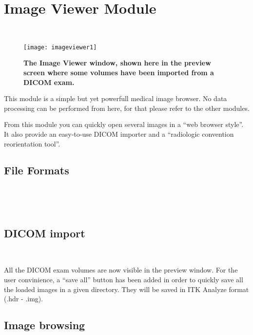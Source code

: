 \index{}\chapter{Image Viewer Module}
\label{sec:imageviewer}

\minitoc \ \\

\begin{figure}[htbp]
  \centering \texttt{[image: imageviewer1]}
  \caption{{\bf The Image Viewer window, shown here in the preview screen where some
      volumes have been imported from a DICOM exam.}
  \label{fig:imageviewer}}
\end{figure}

This module is a simple but yet powerfull medical image browser. No data processing can be
performed from here, for that please refer to the other modules.

From this module you can quickly open several images in a ``web browser style''. It also provide an easy-to-use DICOM
importer and a ``radiologic convention reorientation tool''. 

\section{File Formats}
\label{sec:fileformats}
\ \\

\ifalone

\else
	
\fi

\ \\

\section{DICOM import}
\label{sec:dicomimport}
\ \\

\ifalone

\else
	
\fi



All the DICOM exam volumes are now visible in the preview window. For the user
convinience, a ``save all'' button has been added in order to quickly save all the loaded
images in a given directory. They will be saved in ITK Analyze format (.hdr - .img). 

\section{Image browsing}
\label{sec:imagebrowsing}
\ \\

